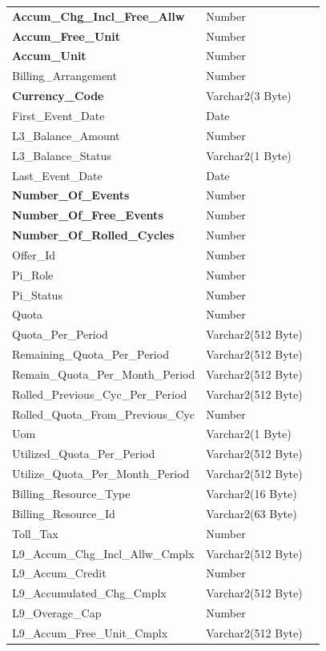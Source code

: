 \documentclass[12pt,twoside]{article}
\begin{document}
\begin{longtable}{l|l|l}
\textbf{Accum\_Chg\_Incl\_Free\_Allw} & Number & \\
\textbf{Accum\_Free\_Unit} & Number & \\
\textbf{Accum\_Unit} & Number & \\
Billing\_Arrangement & Number & \\
\textbf{Currency\_Code} & Varchar2(3 Byte) & \\
First\_Event\_Date & Date & \\
L3\_Balance\_Amount & Number & \\
L3\_Balance\_Status & Varchar2(1 Byte) & \\
Last\_Event\_Date & Date & \\
\textbf{Number\_Of\_Events} & Number & \\
\textbf{Number\_Of\_Free\_Events} & Number & \\
\textbf{Number\_Of\_Rolled\_Cycles} & Number & \\
Offer\_Id & Number & \\
Pi\_Role & Number & \\
Pi\_Status & Number & \\
Quota & Number & \\
Quota\_Per\_Period & Varchar2(512 Byte) & \\
Remaining\_Quota\_Per\_Period & Varchar2(512 Byte) & \\
Remain\_Quota\_Per\_Month\_Period & Varchar2(512 Byte) & \\
Rolled\_Previous\_Cyc\_Per\_Period & Varchar2(512 Byte) & \\
Rolled\_Quota\_From\_Previous\_Cyc & Number & \\
Uom & Varchar2(1 Byte) & \\
Utilized\_Quota\_Per\_Period & Varchar2(512 Byte) & \\
Utilize\_Quota\_Per\_Month\_Period & Varchar2(512 Byte) & \\
Billing\_Resource\_Type & Varchar2(16 Byte) & \\
Billing\_Resource\_Id & Varchar2(63 Byte) & \\
Toll\_Tax & Number & \\
L9\_Accum\_Chg\_Incl\_Allw\_Cmplx & Varchar2(512 Byte) & \\
L9\_Accum\_Credit & Number & \\
L9\_Accumulated\_Chg\_Cmplx & Varchar2(512 Byte) & \\
L9\_Overage\_Cap & Number & \\
L9\_Accum\_Free\_Unit\_Cmplx & Varchar2(512 Byte) & \\

\end{longtable}
\end{document}
